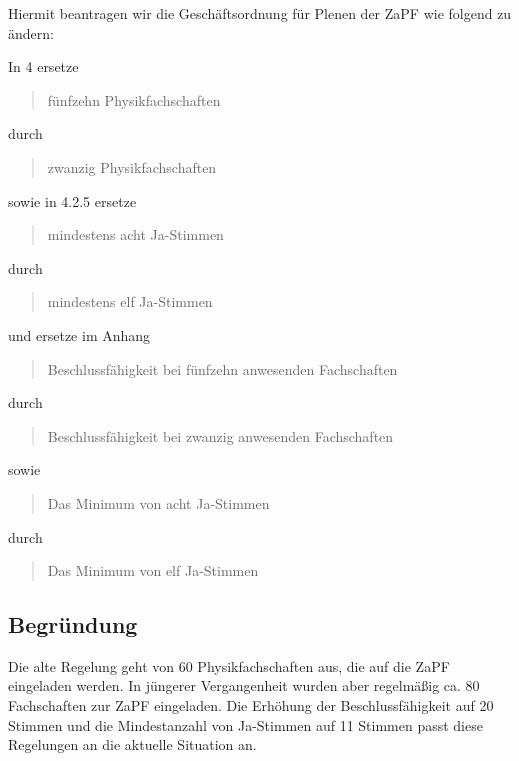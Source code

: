 \documentclass[draft,10pt,oneside]{scrartcl}
\begin{document}
Hiermit beantragen wir die Geschäftsordnung für Plenen der ZaPF wie folgend zu
ändern:

In 4 ersetze
\begin{quote}
	fünfzehn Physikfachschaften
\end{quote}
durch
\begin{quote}
	zwanzig Physikfachschaften
\end{quote}
sowie in 4.2.5 ersetze
\begin{quote}
	mindestens acht Ja-Stimmen
\end{quote}
durch
\begin{quote}
	mindestens elf Ja-Stimmen
\end{quote}
und ersetze im Anhang
\begin{quote}
	Beschlussfähigkeit bei fünfzehn anwesenden Fachschaften
\end{quote}
durch
\begin{quote}
	Beschlussfähigkeit bei zwanzig anwesenden Fachschaften
\end{quote}
sowie
\begin{quote}
	Das Minimum von acht Ja-Stimmen
\end{quote}
durch
\begin{quote}
	Das Minimum von elf Ja-Stimmen
\end{quote}

\subsection*{Begründung}
Die alte Regelung geht von 60 Physikfachschaften aus, die auf die ZaPF
eingeladen werden. In jüngerer Vergangenheit wurden aber regelmäßig ca. 80
Fachschaften zur ZaPF eingeladen. Die Erhöhung der Beschlussfähigkeit auf 20
Stimmen und die Mindestanzahl von Ja-Stimmen auf 11 Stimmen passt diese
Regelungen an die aktuelle Situation an.
\end{document}
